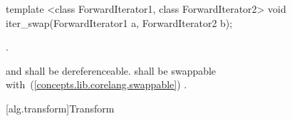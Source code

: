 \begin{removedblock}
%
\begin{itemdecl}
template <class ForwardIterator1, class ForwardIterator2>
  void iter_swap(ForwardIterator1 a, ForwardIterator2 b);
\end{itemdecl}


\begin{itemdescr}
\pnum
\effects
{}.

\pnum
\requires
{} and  shall be dereferenceable.  shall be
swappable with~(\ref{concepts.lib.corelang.swappable}) .
\end{itemdescr}
\end{removedblock}

[alg.transform]{Transform}

